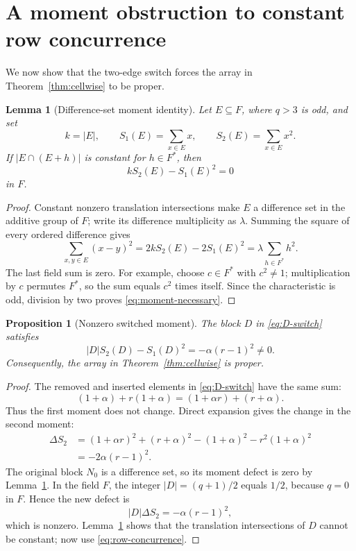 \documentclass[11pt]{article}
\newtheorem{lemma}[theorem]{Lemma}
\newtheorem{proposition}[theorem]{Proposition}
\theoremstyle{definition}
\theoremstyle{remark}
\begin{document}
\section{A moment obstruction to constant row concurrence}
We now show that the two-edge switch forces the array in
Theorem~\ref{thm:cellwise} to be proper.

\begin{lemma}[Difference-set moment identity]
\label{lem:moment}
Let \(E\subseteq F\), where \(q>3\) is odd, and set
\[
 k=|E|,\qquad S_1(E)=\sum_{x\in E}x,
 \qquad S_2(E)=\sum_{x\in E}x^2.
\]
If \(|E\cap(E+h)|\) is constant for \(h\in F^*\), then
\begin{equation}
 kS_2(E)-S_1(E)^2=0
 \label{eq:moment-necessary}
\end{equation}
in \(F\).
\end{lemma}

\begin{proof}
Constant nonzero translation intersections make \(E\) a difference set in
the additive group of \(F\); write its difference multiplicity as \(\lambda\).
Summing the square of every ordered difference gives
\[
 \sum_{x,y\in E}(x-y)^2
 =2kS_2(E)-2S_1(E)^2
 =\lambda\sum_{h\in F^*}h^2.
\]
The last field sum is zero.  For example, choose \(c\in F^*\) with
\(c^2\ne1\); multiplication by \(c\) permutes \(F^*\), so the sum equals
\(c^2\) times itself.  Since the characteristic is odd, division by two
proves \eqref{eq:moment-necessary}.
\end{proof}

\begin{proposition}[Nonzero switched moment]
\label{prop:proper}
The block \(D\) in \eqref{eq:D-switch} satisfies
\begin{equation}
 |D|S_2(D)-S_1(D)^2=-\alpha(r-1)^2\ne0.
 \label{eq:moment-defect}
\end{equation}
Consequently, the array in Theorem~\ref{thm:cellwise} is proper.
\end{proposition}

\begin{proof}
The removed and inserted elements in \eqref{eq:D-switch} have the same sum:
\[
 (1+\alpha)+r(1+\alpha)=(1+\alpha r)+(r+\alpha).
\]
Thus the first moment does not change.  Direct expansion gives the change in
the second moment:
\begin{align*}
 \Delta S_2
 &=(1+\alpha r)^2+(r+\alpha)^2
   -(1+\alpha)^2-r^2(1+\alpha)^2\\
 &=-2\alpha(r-1)^2.
\end{align*}
The original block \(N_0\) is a difference set, so its moment defect is zero
by Lemma~\ref{lem:moment}.  In the field \(F\), the integer
\(|D|=(q+1)/2\) equals \(1/2\), because \(q=0\) in \(F\).  Hence the new
defect is
\[
 |D|\Delta S_2=-\alpha(r-1)^2,
\]
which is nonzero.  Lemma~\ref{lem:moment} shows that the translation
intersections of \(D\) cannot be constant; now use
\eqref{eq:row-concurrence}.
\end{proof}
\end{document}
